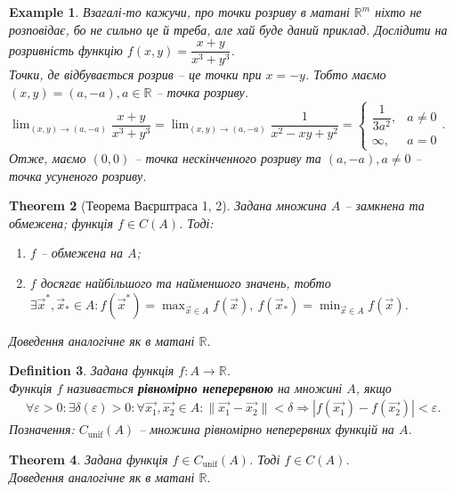 \documentclass[a4paper, 10pt]{article}
\theoremstyle{theoremdd}
\newtheorem{theorem}{Theorem}[subsection]
\theoremstyle{theoremdd}
\theoremstyle{theoremdd}
\newtheorem{definition}[theorem]{Definition}
\theoremstyle{theoremdd}
\theoremstyle{theoremdd}
\newtheorem{example}[theorem]{Example}
\theoremstyle{theoremdd}
\theoremstyle{theoremdd}
\theoremstyle{theoremdd}
\theoremstyle{theoremdd}
\newcommand\Norm[1]{\|#1\|}
\begin{document}
\begin{example}
Взагалі-то кажучи, про точки розриву в матані $\mathbb{R}^m$ ніхто не розповідає, бо не сильно це й треба, але хай буде даний приклад. Дослідити на розривність функцію $f(x,y) = \dfrac{x+y}{x^3+y^3}$.\\
Точки, де відбувається розрив -- це точки при $x = -y$. Тобто маємо $(x,y) = (a,-a), a \in \mathbb{R}$ -- точка розриву.\\
$\displaystyle\lim_{(x,y) \to (a,-a)} \dfrac{x+y}{x^3+y^3} = \lim_{(x,y) \to (a,-a)} \dfrac{1}{x^2-xy+y^2} = \begin{cases} \dfrac{1}{3a^2}, & a \neq 0 \\ \infty, & a = 0 \end{cases} $.\\
Отже, маємо $(0,0)$ -- точка нескінченного розриву та $(a,-a), a \neq 0$ -- точка усуненого розриву.
\end{example}

\begin{theorem}[Теорема Ваєрштраса 1, 2]
Задана множина $A$ -- замкнена та обмежена; функція $f \in C(A)$. Тоді:
\begin{enumerate}[nosep,wide=0pt]
\item $f$ -- обмежена на $A$;
\item $f$ досягає найбільшого та найменшого значень, тобто $\exists \vec{x}^*, \vec{x}_* \in A: f(\vec{x}^*) = \displaystyle\max_{\vec{x} \in A} f(\vec{x}),\ f(\vec{x}_*) = \displaystyle\min_{\vec{x} \in A} f(\vec{x})$.
\end{enumerate}
\textit{Доведення аналогічне як в матані $\mathbb{R}$.}
\end{theorem}

\begin{definition}
Задана функція $f \colon A \to \mathbb{R}$.\\
Функція $f$ називається \textbf{рівномірно неперервною} на множині $A$, якщо
\begin{align*}
\forall \varepsilon > 0: \exists \delta(\varepsilon) > 0: \forall \vec{x_1}, \vec{x_2} \in A: \Norm{\vec{x_1} - \vec{x_2}} < \delta \Rightarrow |f(\vec{x_1}) - f(\vec{x_2})| < \varepsilon .
\end{align*}
Позначення: $C_{\text{unif}}(A)$ -- множина рівномірно неперервних функцій на $A$.
\end{definition}

\begin{theorem}
Задана функція $f \in C_{\text{unif}}(A)$. Тоді $f \in C(A)$.\\
\textit{Доведення аналогічне як в матані $\mathbb{R}$.}
\end{theorem}
\end{document}
